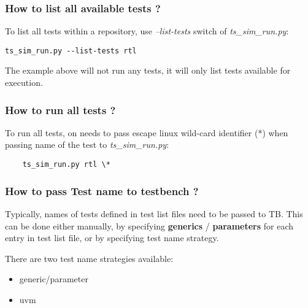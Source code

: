 \documentclass{tropic_design_spec}
\begin{document}
\subsubsection{How to list all available tests ?}
\label{sec:how-to-list-all-available-tests}

To list all tests within a repository, use \textit{--list-tests} switch of 
\textit{ts_sim_run.py}:

\begin{lstlisting}
ts_sim_run.py --list-tests rtl
\end{lstlisting}

The example above will not run any tests, it will only list tests available
for execution.


\subsubsection{How to run all tests ?}
\label{sec:how-to-run-all-tests}

To run all tests, on needs to pass escape linux wild-card identifier (*) when passing name
of the test to \textit{ts_sim_run.py}:

\begin{lstlisting}
    ts_sim_run.py rtl \*
\end{lstlisting}


\subsubsection{How to pass Test name to testbench ?}
\label{sec:how-to-pass-test-name-to-testbench}

Typically, names of tests defined in test list files need to be passed to TB. This can
be done either manually, by specifying \textbf{generics} / \textbf{parameters} for each
entry in test list file, or by specifying test name strategy.

There are two test name strategies available:
\begin{itemize}
    \item generic/parameter
    \item uvm
\end{itemize}
\end{document}

